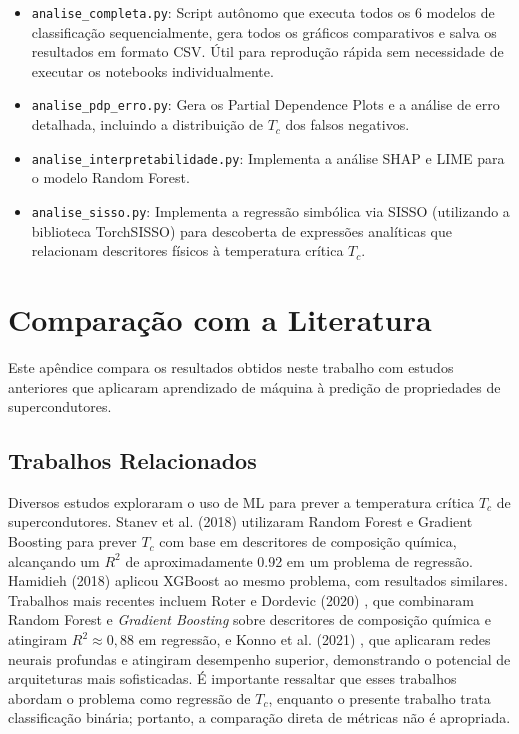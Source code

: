 \documentclass[12pt, a4paper, oneside]{report}
\begin{document}
\begin{itemize}
    \item \texttt{analise\_completa.py}: Script autônomo que executa todos os 6 modelos de classificação sequencialmente, gera todos os gráficos comparativos e salva os resultados em formato CSV. Útil para reprodução rápida sem necessidade de executar os notebooks individualmente.
    \item \texttt{analise\_pdp\_erro.py}: Gera os Partial Dependence Plots e a análise de erro detalhada, incluindo a distribuição de $T_c$ dos falsos negativos.
    \item \texttt{analise\_interpretabilidade.py}: Implementa a análise SHAP e LIME para o modelo Random Forest.
    \item \texttt{analise\_sisso.py}: Implementa a regressão simbólica via SISSO (utilizando a biblioteca TorchSISSO) para descoberta de expressões analíticas que relacionam descritores físicos à temperatura crítica $T_c$.
\end{itemize}

\chapter{Comparação com a Literatura}
\label{app:literatura}

Este apêndice compara os resultados obtidos neste trabalho com estudos anteriores que aplicaram aprendizado de máquina à predição de propriedades de supercondutores.

\section{Trabalhos Relacionados}

Diversos estudos exploraram o uso de ML para prever a temperatura crítica $T_c$ de supercondutores. Stanev et al. (2018) \cite{stanev2018} utilizaram Random Forest e Gradient Boosting para prever $T_c$ com base em descritores de composição química, alcançando um $R^2$ de aproximadamente 0.92 em um problema de regressão. Hamidieh (2018) \cite{hamidieh2018} aplicou XGBoost ao mesmo problema, com resultados similares. Trabalhos mais recentes incluem Roter e Dordevic (2020) \cite{roter2020}, que combinaram Random Forest e \textit{Gradient Boosting} sobre descritores de composição química e atingiram $R^2 \approx 0{,}88$ em regressão, e Konno et al. (2021) \cite{konno2021}, que aplicaram redes neurais profundas e atingiram desempenho superior, demonstrando o potencial de arquiteturas mais sofisticadas. É importante ressaltar que esses trabalhos abordam o problema como regressão de $T_c$, enquanto o presente trabalho trata classificação binária; portanto, a comparação direta de métricas não é apropriada.
\end{document}
